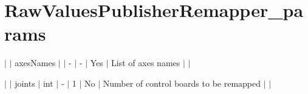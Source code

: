 \chapter{Raw\+Values\+Publisher\+Remapper\+\_\+params }
\hypertarget{md_icub-main_2src_2libraries_2icubmod_2rawValuesPublisherRemapper_2RawValuesPublisherRemapper__params}{}\label{md_icub-main_2src_2libraries_2icubmod_2rawValuesPublisherRemapper_2RawValuesPublisherRemapper__params}

\begin{DoxyItemize}
\item \texorpdfstring{$\vert$}{|} \texorpdfstring{$\vert$}{|} axes\+Names \texorpdfstring{$\vert$}{|}  \texorpdfstring{$\vert$}{|} -\/ \texorpdfstring{$\vert$}{|} -\/ \texorpdfstring{$\vert$}{|} Yes \texorpdfstring{$\vert$}{|} List of axes names \texorpdfstring{$\vert$}{|} \texorpdfstring{$\vert$}{|}
\item \texorpdfstring{$\vert$}{|} \texorpdfstring{$\vert$}{|} joints \texorpdfstring{$\vert$}{|} int \texorpdfstring{$\vert$}{|} -\/ \texorpdfstring{$\vert$}{|} 1 \texorpdfstring{$\vert$}{|} No \texorpdfstring{$\vert$}{|} Number of control boards to be remapped \texorpdfstring{$\vert$}{|} \texorpdfstring{$\vert$}{|} 
\end{DoxyItemize}